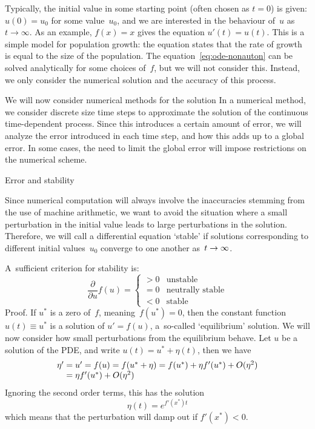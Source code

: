 Typically, the initial value in some starting point (often
chosen as $t=0$) is given: $u(0)=u_0$ for some value~$u_0$, and we are
interested in the behaviour of~$u$ as $t\rightarrow\infty$. As an
example, $f(x)=x$ gives the equation $u'(t)=u(t)$. This is a
simple model for population growth: the equation states that the rate
of growth is equal to the size of the population.
The equation~\eqref{eq:ode-nonauton} can be solved analytically for some
choices of~$f$, but we will not consider this. Instead, we only
consider the numerical solution and the accuracy of this process.

We will now consider numerical methods for the solution
In a numerical method, we consider discrete size time steps to
approximate the solution of the continuous time-dependent
process. Since this introduces a certain amount of error, we will
analyze the error introduced in each time step, and how this adds up
to a global error. In some cases, the need to limit the global error
will impose restrictions on the numerical scheme.

 {Error and stability}

Since numerical computation will always involve the inaccuracies
stemming from the use of machine arithmetic, we want to avoid the
situation where a small perturbation in the initial value leads to
large perturbations in the solution. Therefore, we
will call a
differential equation `stable' if solutions corresponding to different
initial values~$u_0$ converge to one another
as~$t\rightarrow\nobreak\infty$. 

A~sufficient criterion for stability is:
  \[ \frac\partial{\partial u}f(u)=
  \begin{cases}
    >0&\mbox{unstable}\\ =0&\mbox{neutrally stable}\\ <0&\mbox{stable}
  \end{cases}
  \]
Proof. If $u^*$ is a zero of~$f$, meaning~$f(u^*)=0$, then the
constant function $u(t)\equiv u^*$ is a solution of $u'=f(u)$,
a~so-called `equilibrium' solution. We will now consider how small
perturbations from the equilibrium behave. Let $u$ be a solution of
the PDE, and write $u(t)=u^*+\eta(t)$, then we have
\[
\begin{array}{r@{{}={}}l}
  \eta'&u'=f(u)=f(u^*+\eta)=f(u^*)+\eta f'(u^*)+O(\eta^2)\\
     &\eta f'(u^*)+O(\eta^2)
\end{array}
\]
Ignoring the second order terms, this has the solution
\[ \eta(t)=e^{f'(x^*)t} \]
which means that the perturbation will damp out if $f'(x^*)<0$.

